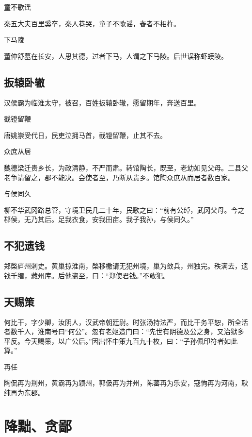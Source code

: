 \documentclass[a4paper,12pt,UTF8,twoside]{ctexbook}
\begin{document}
    童不歌谣
    
    秦五大夫百里奚卒，秦人巷哭，童子不歌谣，舂者不相杵。
    
    下马陵
    
    董仲舒墓在长安，人思其德，过者下马，人谓之下马陵。后世误称虾蟆陵。
    
    \section{扳辕卧辙}
    
    汉侯霸为临淮太守，被召，百姓扳辕卧辙，愿留期年，奔送百里。
    
    截镫留鞭
    
    唐姚崇受代日，民吏泣拥马首，截镫留鞭，止其不去。
    
    众庶从居
    
    魏德梁迁贵乡长，为政清静，不严而肃。转馆陶长，既至，老幼如见父母。二县父老争请留之，郡不能决。会使者至，乃断从贵乡。馆陶众庶从而居者数百家。
    
    与侯同久
    
    柳不华武冈路总管，守境卫民几二十年，民歌之曰：“前有公绰，武冈父母。今之郡侯，无乃其后。足我衣食，安我田亩。我子我孙，与侯同久。”
    
    \section{不犯遗钱}
    
    郑棨庐州刺史。黄巢掠淮南，棨移檄请无犯州境，巢为敛兵，州独完。秩满去，遗钱千缗，藏州库。后他盗至，曰：“郑使君钱。”不敢犯。
    
    \section{天赐策}
    
    何比干，字少卿，汝阴人，汉武帝朝廷尉。时张汤持法严，而比干务平恕，所全活者数千人，淮南号曰“何公”。忽有老妪造门曰：“先世有阴德及公之身，又治狱多平反。今天赐策，以广公后。”因出怀中策九百九十枚，曰：“子孙佩印符者如此算。”
    
    再任
    
    陶侃再为荆州，黄霸再为颖州，郭伋再为并州，陈蕃再为乐安，寇恂再为河南，耿纯再为东郡。
    
    \chapter{降黜、贪鄙}
    
\end{document}
